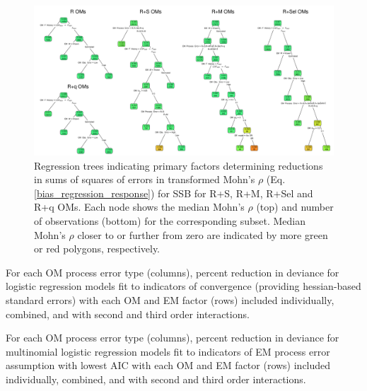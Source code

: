 \documentclass[
  12pt,
]{article}
\begin{document}
\begin{landscape}
\begin{figure}
\begin{center}
\includegraphics[width = 1.4\textwidth]{SSB_mohns_rho_regtree_plots}
\end{center}
\caption{Regression trees indicating primary factors determining reductions in sums of squares of errors in transformed Mohn's $\rho$ (Eq. \ref{bias_regression_response}) for SSB for R+S, R+M, R+Sel and R+q OMs. Each node shows the median Mohn's $\rho$ (top) and number of observations (bottom) for the corresponding subset. Median Mohn's $\rho$ closer to or further from zero are indicated by more green or red polygons, respectively.}\label{SSB_mohns_rho_regtree}
\end{figure}
\end{landscape}

\pagebreak

\begin{table}
\caption{For each OM process error type (columns), percent reduction in deviance for logistic regression models fit to indicators of convergence (providing hessian-based standard errors) with each OM and EM factor (rows) included individually, combined, and with second and third order interactions.}\label{convergence_PRD_table}
{}
\end{table}

\begin{table}
\caption{For each OM process error type (columns), percent reduction in deviance for multinomial logistic regression models fit to indicators of EM process error assumption with lowest AIC with each OM and EM factor (rows) included individually, combined, and with second and third order interactions.}\label{AIC_PE_PRD_table}
{}
\end{table}
\end{document}
